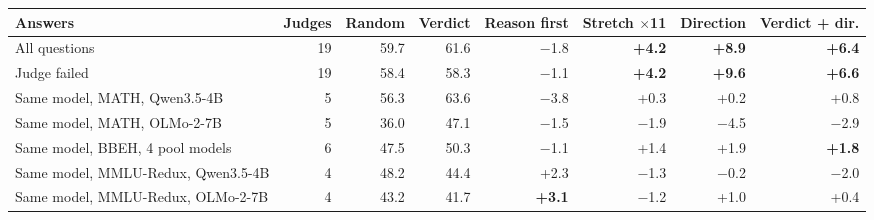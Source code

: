 \begin{tabular}{lr rr rrrr}
\toprule
Answers & Judges & Random & Verdict & Reason first & Stretch $\times$11 & Direction & Verdict + dir. \\
\midrule
All questions & 19 & 59.7 & 61.6 & $-$1.8 & \textbf{+4.2} & \textbf{+8.9} & \textbf{+6.4} \\
Judge failed & 19 & 58.4 & 58.3 & $-$1.1 & \textbf{+4.2} & \textbf{+9.6} & \textbf{+6.6} \\
Same model, MATH, Qwen3.5-4B & 5 & 56.3 & 63.6 & $-$3.8 & +0.3 & +0.2 & +0.8 \\
Same model, MATH, OLMo-2-7B & 5 & 36.0 & 47.1 & $-$1.5 & $-$1.9 & $-$4.5 & $-$2.9 \\
Same model, BBEH, 4 pool models & 6 & 47.5 & 50.3 & $-$1.1 & +1.4 & +1.9 & \textbf{+1.8} \\
Same model, MMLU-Redux, Qwen3.5-4B & 4 & 48.2 & 44.4 & +2.3 & $-$1.3 & $-$0.2 & $-$2.0 \\
Same model, MMLU-Redux, OLMo-2-7B & 4 & 43.2 & 41.7 & \textbf{+3.1} & $-$1.2 & +1.0 & +0.4 \\
\bottomrule
\end{tabular}

